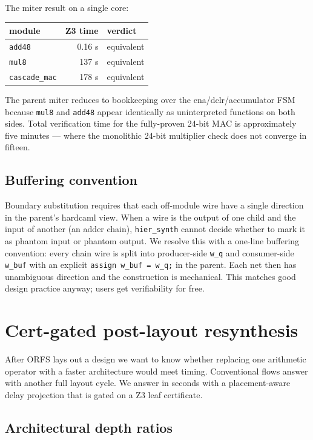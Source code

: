 \documentclass[11pt,a4paper]{article}
\begin{document}
The miter result on a single core:

\begin{center}
\begin{tabular}{l r l}
\toprule
module & Z3 time & verdict \\
\midrule
\texttt{add48} & 0.16 s & equivalent \\
\texttt{mul8}  & 137 s  & equivalent \\
\texttt{cascade\_mac} & 178 s & equivalent \\
\bottomrule
\end{tabular}
\end{center}

The parent miter reduces to bookkeeping over the ena/dclr/accumulator
FSM because \texttt{mul8} and \texttt{add48} appear identically as
uninterpreted functions on both sides.  Total verification time
for the fully-proven 24-bit MAC is approximately five minutes ---
where the monolithic 24-bit multiplier check does not converge in
fifteen.

\subsection{Buffering convention}

Boundary substitution requires that each off-module wire have a
single direction in the parent's hardcaml view.  When a wire is
the output of one child and the input of another (an adder
chain), \texttt{hier\_synth} cannot decide whether to mark it as
phantom input or phantom output.  We resolve this with a one-line
buffering convention: every chain wire is split into producer-side
\texttt{w\_q} and consumer-side \texttt{w\_buf} with an explicit
\texttt{assign w\_buf = w\_q;} in the parent.  Each net then has
unambiguous direction and the construction is mechanical.  This
matches good design practice anyway; users get verifiability for
free.

\section{Cert-gated post-layout resynthesis}
\label{sec:resynth}

After ORFS lays out a design we want to know whether replacing one
arithmetic operator with a faster architecture would meet timing.
Conventional flows answer with another full layout cycle.  We
answer in seconds with a placement-aware delay projection that is
gated on a Z3 leaf certificate.

\subsection{Architectural depth ratios}
\end{document}
